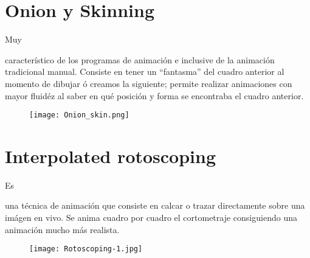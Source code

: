 \documentclass[stu, 12pt, letterpaper, donotrepeattitle, floatsintext, natbib]{apa7}
\begin{document}
    \section{Onion y Skinning}
    Muy \begin{justifying}
      característico de los programas de animación e inclusive de la animación tradicional manual. Consiste en tener un ``fantasma'' del cuadro anterior
      al momento de dibujar ó creamos la siguiente; permite realizar animaciones con mayor fluidéz al saber en qué posición y forma se encontraba el cuadro anterior.\citep{unknown-author-2017}\par %
    \end{justifying}
    \begin{figure}[H]
      \centering
      \texttt{[image: Onion\_skin.png]}
    \end{figure}
    \vspace{\baselineskip}
    \section{Interpolated rotoscoping}
    Es \begin{justifying}
      una técnica de animación que consiste en calcar o trazar directamente sobre una imágen en vivo. Se anima cuadro por cuadro el cortometraje
      consiguiendo una animación mucho más realista. \citep{ana-2021}%
      \par
    \end{justifying}
    \begin{figure}[H]
      \centering
      \texttt{[image: Rotoscoping-1.jpg]}
    \end{figure}
    \vspace{\baselineskip}
    \newpage   
    \renewcommand\refname{\textbf{Referencias}}
    
    
\end{document}
